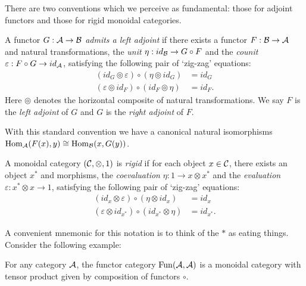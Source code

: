 \documentclass{amsart}
\begin{document}
There are two conventions which we perceive as fundamental: those for adjoint functors and those for rigid monoidal categories. 
\begin{definition} [Convention A]
	A functor $G: \mathcal A \to \mathcal B$ {\em admits a left adjoint} if there exists a functor $F: \mathcal B \to \mathcal A$ and natural transformations, the {\em unit} $\eta: id_{\mathcal B} \to G \circ F$ and the {\em counit} $\varepsilon: F \circ G \to id_{\mathcal A}$, satisfying the following pair of `zig-zag' equations:
	\begin{align*}
		(id_{G} \circledcirc \varepsilon  ) \circ (  \eta \circledcirc id_{G}) &= id_{G} \\
		(\varepsilon \circledcirc id_{F}) \circ (id_{F} \circledcirc \eta) &= id_{F}.
	\end{align*}
Here $\circledcirc$ denotes the horizontal composite of natural transformations.
We say $F$ is the {\em left adjoint} of $G$ and $G$ is the {\em right adjoint} of $F$. 
\end{definition}
With this standard convention we have a canonical natural isomorphisms $\operatorname{Hom}_\mathcal A(F(x), y) \cong \operatorname{Hom}_\mathcal B(x, G(y))$. 
\begin{definition} [Convention B] \label{def:rigid}
	A monoidal category $(\mathcal C, \otimes, 1)$ is {\em rigid} if for each object $x \in \mathcal C$, there exists an object $x^*$ and morphisms, the {\em coevaluation} $\eta: 1 \to x \otimes x^*$ and the {\em evaluation} $\varepsilon: x^* \otimes x \to 1$, satisfying the following pair of `zig-zag' equations:
	\begin{align*}
		(id_{x} \otimes \varepsilon  ) \circ (  \eta \otimes id_{x}) &= id_{x} \\
		(\varepsilon \otimes id_{x^*}) \circ (id_{x^*} \otimes \eta) &= id_{x^*}.
	\end{align*}
\end{definition}
A convenient mnemonic for this notation is to think of the $*$ as eating things. Consider the following example:
\begin{example}
	For any category $\mathcal A$, the functor category $\operatorname{Fun}(\mathcal A, \mathcal A)$ is a monoidal category with tensor product given by composition of functors $\circ$. 
\end{example}
\end{document}
